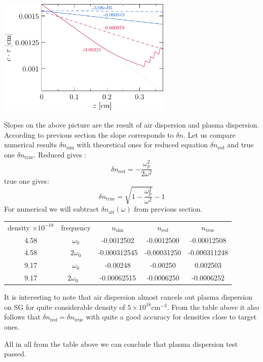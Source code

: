 \documentclass{article}
\newcommand{\ff}{\frac}
\begin{document}
\centerline{\includegraphics[width=8.3cm]{test/plasma_disp_test.pdf}}
Slopes on the above picture are the result of air dispersion and plasma dispersion. According to previous section the slope corresponds to $\delta n$. Let us compare numerical results $\delta n_\mathrm{sim}$ with theoretical ones for reduced equation $\delta n_\mathrm{red}$ and true one $\delta n_\mathrm{true}$.
Reduced gives : 
\[ \delta n_\mathrm{red} = - \ff{\omega_p^2}{2 \omega^2} \]
true one gives:
\[ \delta n_\mathrm{true} = \sqrt{1 - \ff{\omega_p^2}{\omega^2}} - 1 \]
For numerical we will subtract $\delta n_\mathrm{air}(\omega)$ from previous section.
\begin{center}
\begin{tabular}{ c c c c c }
 density $\times 10^{-18}$ & frequency & $n_\mathrm{sim}$ & $n_\mathrm{red}$ & $n_\mathrm{true}$ \\ 
 4.58 & $\omega_0$ & -0.0012502 & -0.0012500 & -0.00012508 \\ 
 4.58 & $2\omega_0$ & -0.000312545 & -0.00031250 & -0.000311248 \\
 9.17 & $\omega_0$ & -0.00248 & -0.00250 & 0.002503 \\  
 9.17 & $2 \omega_0$ \ & -0.00062515 & -0.0006250 & -0.0006252    
\end{tabular}
\end{center}

It is interesting to note that air dispersion almost cancels out plasma dispersion on SG for quite considerable density of $5\times10^{18}\mathrm{cm}^{-3}$. From the table above it also follows that $\delta n_\mathrm{red}=\delta n_\mathrm{true}$ with quite a good accuracy for densities close to target ones.

\noindent
All in all from the table above we can conclude that plasma dispersion test passed.

\newpage
\end{document}
